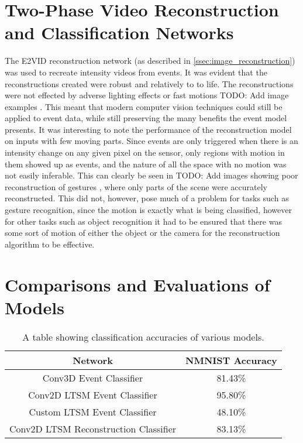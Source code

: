 \section{Two-Phase Video Reconstruction and Classification Networks}

The E2VID reconstruction network (as described in \cref{ssec:image_reconstruction}) was used to recreate intensity videos from events. It was evident that the reconstructions created were robust and relatively to to life. The reconstructions were not effected by adverse lighting effects or fast motions \color{red} TODO: Add image examples \color{black}. This meant that modern computer vision techniques could still be applied to event data, while still preserving the many benefits the event model presents. It was interesting to note the performance of the reconstruction model on inputs with few moving parts. Since events are only triggered when there is an intensity change on any given pixel on the sensor, only regions with motion in them showed up as events, and the nature of all the space with no motion was not easily inferable. This can clearly be seen in \color{red} TODO: Add images showing poor reconstruction of gestures \color{black}, where only parts of the scene were accurately reconstructed. This did not, however, pose much of a problem for tasks such as gesture recognition, since the motion is exactly what is being classified, however for other tasks such as object recognition it had to be ensured that there was some sort of motion of either the object or the camera for the reconstruction algorithm to be effective.

\section{Comparisons and Evaluations of Models}

\begin{table}[htb]
    \centering
    \begin{tabular}{|| c  | c ||}
        \hline
        Network     & NMNIST Accuracy \\
        \hline \hline
        Conv3D Event Classifier          & 81.43\%           \\
        \hline
        Conv2D LTSM Event Classifier         & 95.80\%           \\
        \hline
        Custom LTSM Event Classifier         & \color{red} 48.10\% \color{black}           \\
        \hline
        Conv2D LTSM Reconstruction Classifier           & \color{red} 83.13\% \color{black}           \\
        \hline
    \end{tabular}
    \caption{A table showing classification accuracies of various models.}
    \label{tab:network_performances}
\end{table}


